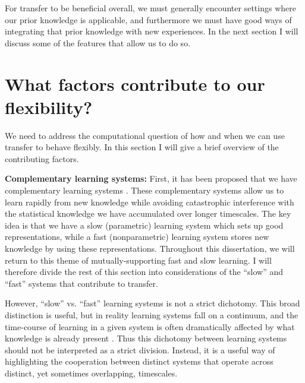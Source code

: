 For transfer to be beneficial overall, we must generally encounter settings where our prior knowledge is applicable, and furthermore we must have good ways of integrating that prior knowledge with new experiences. In the next section I will discuss some of the features that allow us to do so. \par

\section{What factors contribute to our flexibility?}
We need to address the computational question of how and when we can use transfer to behave flexibly. In this section I will give a brief overview of the contributing factors. \par 

\textbf{Complementary learning systems:} First, it has been proposed that we have complementary learning systems \citep{McClelland1995, Kumaran2016}. These complementary systems allow us to learn rapidly from new knowledge while avoiding catastrophic interference \citep{McCloskey1989} with the statistical knowledge we have accumulated over longer timescales. The key idea is that we have a slow (parametric) learning system which sets up good representations, while a fast (nonparametric) learning system stores new knowledge by using these representations. Throughout this dissertation, we will return to this theme of mutually-supporting fast and slow learning. I will therefore divide the rest of this section into considerations of the ``slow'' and ``fast'' systems that contribute to transfer.\par
However, ``slow'' vs. ``fast'' learning systems is not a strict dichotomy. This broad distinction is useful, but in reality learning systems fall on a continuum, and the time-course of learning in a given system is often dramatically affected by what knowledge is already present \citep[][]{McClelland2013, McClelland2020}. Thus this dichotomy between learning systems should not be interpreted as a strict division. Instead, it is a useful way of highlighting the cooperation between distinct systems that operate across distinct, yet sometimes overlapping, timescales. \par 

